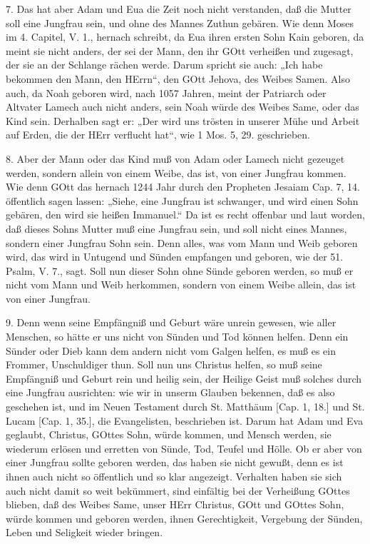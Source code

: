 7. Das hat aber Adam und Eua die Zeit noch nicht verstanden, daß die Mutter soll eine Jungfrau sein, und ohne des Mannes Zuthun gebären. Wie denn Moses im 4. Capitel, V. 1., hernach schreibt, da Eua ihren ersten Sohn Kain geboren, da meint sie nicht anders, der sei der Mann, den ihr GOtt verheißen und zugesagt, der sie an der Schlange rächen werde. Darum spricht sie auch: „Ich habe bekommen den Mann, den HErrn“, den GOtt Jehova, des Weibes Samen. Also auch, da Noah geboren wird, nach 1057 Jahren, meint der Patriarch oder Altvater Lamech auch nicht anders, sein Noah würde des Weibes Same, oder das Kind sein. Derhalben sagt er: „Der wird uns trösten in unserer Mühe und Arbeit auf Erden, die der HErr verflucht hat“, wie 1 Mos. 5, 29. geschrieben.

8. Aber der Mann oder das Kind muß von Adam oder Lamech nicht gezeuget werden, sondern allein von einem Weibe, das ist, von einer Jungfrau kommen. Wie denn GOtt das hernach 1244 Jahr durch den Propheten Jesaiam Cap. 7, 14. öffentlich sagen lassen: „Siehe, eine Jungfrau ist schwanger, und wird einen Sohn gebären, den wird sie heißen Immanuel.“ Da ist es recht offenbar und laut worden, daß dieses
Sohns Mutter muß eine Jungfrau sein, und soll nicht eines Mannes, sondern einer Jungfrau Sohn sein. Denn alles, was vom Mann und Weib geboren wird, das wird in Untugend und Sünden empfangen und geboren, wie der 51. Psalm, V. 7., sagt. Soll nun dieser Sohn ohne Sünde geboren werden, so muß er nicht vom Mann und Weib herkommen, sondern von einem Weibe allein, das ist von einer Jungfrau.

9. Denn wenn seine Empfängniß und Geburt wäre unrein gewesen, wie aller Menschen, so hätte er uns nicht von Sünden und Tod können helfen. Denn ein Sünder oder Dieb kann dem andern nicht vom Galgen helfen, es muß es ein Frommer, Unschuldiger thun. Soll nun uns Christus helfen, so muß seine Empfängniß und Geburt rein und heilig sein, der Heilige Geist muß solches durch eine Jungfrau ausrichten: wie wir in unserm Glauben bekennen, daß es also geschehen ist, und im Neuen Testament durch St. Matthäum [Cap. 1, 18.] und St. Lucam [Cap. 1, 35.], die Evangelisten, beschrieben ist. Darum hat Adam und Eva geglaubt, Christus, GOttes Sohn, würde kommen, und Mensch werden, sie wiederum erlösen und erretten von Sünde, Tod, Teufel und Hölle. Ob er aber von einer Jungfrau sollte geboren werden, das haben sie nicht gewußt, denn es ist ihnen auch nicht so öffentlich und so klar angezeigt. Verhalten haben sie sich auch nicht damit so weit bekümmert, sind einfältig bei der Verheißung GOttes blieben, daß des Weibes Same, unser HErr Christus, GOtt und GOttes Sohn, würde kommen und geboren werden, ihnen Gerechtigkeit, Vergebung der Sünden, Leben und Seligkeit wieder bringen.

